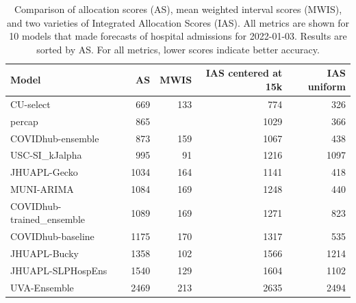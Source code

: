 \documentclass{article}\usepackage[]{graphicx}\usepackage[]{xcolor}
\begin{document}
\begin{table}[ht]
\centering
\begin{tabular}{lrrrr}
  \hline
Model & AS & MWIS & IAS centered at 15k & IAS uniform \\ 
  \hline
CU-select & 669 & 133 & 774 & 326 \\ 
  percap & 865 &  & 1029 & 366 \\ 
  COVIDhub-ensemble & 873 & 159 & 1067 & 438 \\ 
  USC-SI\_kJalpha & 995 & 91 & 1216 & 1097 \\ 
  JHUAPL-Gecko & 1034 & 164 & 1141 & 418 \\ 
  MUNI-ARIMA & 1084 & 169 & 1248 & 440 \\ 
  COVIDhub-trained\_ensemble & 1089 & 169 & 1271 & 823 \\ 
  COVIDhub-baseline & 1175 & 170 & 1317 & 535 \\ 
  JHUAPL-Bucky & 1358 & 102 & 1566 & 1214 \\ 
  JHUAPL-SLPHospEns & 1540 & 129 & 1604 & 1102 \\ 
  UVA-Ensemble & 2469 & 213 & 2635 & 2494 \\ 
   \hline
\end{tabular}
\caption{Comparison of allocation scores (AS), mean weighted interval scores (MWIS), and two varieties of Integrated Allocation Scores (IAS). All metrics are shown for 10 models that made forecasts of hospital admissions for 2022-01-03. Results are sorted by AS. For all metrics, lower scores indicate better accuracy.} 
\label{tab:multi-k-scores}
\end{table}







\end{document}
